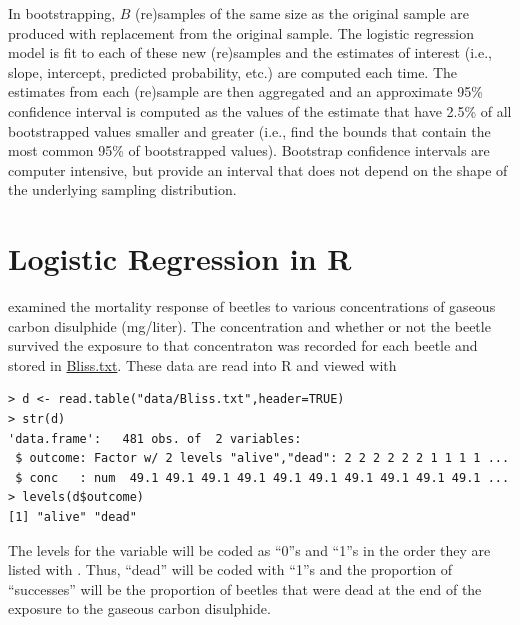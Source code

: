\documentclass[10pt,openany]{book}\usepackage[]{graphicx}\usepackage[]{color}
\makeatletter
\newenvironment{kframe}{%
 \def\at@end@of@kframe{}%
 \ifinner\ifhmode%
  \def\at@end@of@kframe{\end{minipage}}%
  \begin{minipage}{\columnwidth}%
 \fi\fi%
 \def\FrameCommand##1{\hskip\@totalleftmargin \hskip-\fboxsep
 \colorbox{shadecolor}{##1}\hskip-\fboxsep
     \hskip-\linewidth \hskip-\@totalleftmargin \hskip\columnwidth}%
 \MakeFramed {\advance\hsize-\width
   \@totalleftmargin\z@ \linewidth\hsize
   \@setminipage}}%
 {\par\unskip\endMakeFramed%
 \at@end@of@kframe}
\newenvironment{knitrout}{}{} %
\makeatother
\begin{document}
In bootstrapping, $B$ (re)samples of the same size as the original sample are produced with replacement from the original sample.  The logistic regression model is fit to each of these new (re)samples and the estimates of interest (i.e., slope, intercept, predicted probability, etc.) are computed each time.  The estimates from each (re)sample are then aggregated and an approximate 95\% confidence interval is computed as the values of the estimate that have 2.5\% of all bootstrapped values smaller and greater (i.e., find the bounds that contain the most common 95\% of bootstrapped values).  Bootstrap confidence intervals are computer intensive, but provide an interval that does not depend on the shape of the underlying sampling distribution.

\section{Logistic Regression in R}
\cite{Bliss1935} examined the mortality response of beetles to various concentrations of gaseous carbon disulphide (mg/liter).  The concentration and whether or not the beetle survived the exposure to that concentraton was recorded for each beetle and stored in \href{https://sites.google.com/site/ncstats/data/Bliss.txt}{Bliss.txt}.  These data are read into R and viewed with
\begin{knitrout}
\color{fgcolor}\begin{kframe}
\begin{verbatim}
> d <- read.table("data/Bliss.txt",header=TRUE)
> str(d)
'data.frame':	481 obs. of  2 variables:
 $ outcome: Factor w/ 2 levels "alive","dead": 2 2 2 2 2 2 1 1 1 1 ...
 $ conc   : num  49.1 49.1 49.1 49.1 49.1 49.1 49.1 49.1 49.1 49.1 ...
> levels(d$outcome)
[1] "alive" "dead" 
\end{verbatim}
\end{kframe}
\end{knitrout}
The levels for the  variable will be coded as ``0''s and ``1''s in the order they are listed with .  Thus, ``dead'' will be coded with ``1''s and the proportion of ``successes'' will be the proportion of beetles that were dead at the end of the exposure to the gaseous carbon disulphide.
\end{document}

